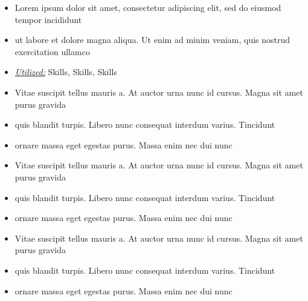 \documentclass[10pt,a4paper,ragged2e]{altacv}
\begin{document}
\begin{itemize}
  \item Lorem ipsum dolor sit amet, consectetur adipiscing elit, sed do eiusmod tempor incididunt
  \item ut labore et dolore magna aliqua. Ut enim ad minim veniam, quis nostrud exercitation ullamco
  \item \underline{\textit{Utilized:}} Skills, Skills, Skills
\end{itemize}
\divider\small


\begin{itemize}
\item Vitae suscipit tellus mauris a. At auctor urna nunc id cursus. Magna sit amet purus gravida
\item quis blandit turpis. Libero nunc consequat interdum varius. Tincidunt
\item ornare massa eget egestas purus. Massa enim nec dui nunc
\end{itemize}
\divider\small

\begin{itemize}
\item Vitae suscipit tellus mauris a. At auctor urna nunc id cursus. Magna sit amet purus gravida
\item quis blandit turpis. Libero nunc consequat interdum varius. Tincidunt
\item ornare massa eget egestas purus. Massa enim nec dui nunc
\end{itemize}
\divider\small

\begin{itemize}
\item Vitae suscipit tellus mauris a. At auctor urna nunc id cursus. Magna sit amet purus gravida
\item quis blandit turpis. Libero nunc consequat interdum varius. Tincidunt
\item ornare massa eget egestas purus. Massa enim nec dui nunc
\end{itemize}

\clearpage
\nocite{*}
\end{document}
